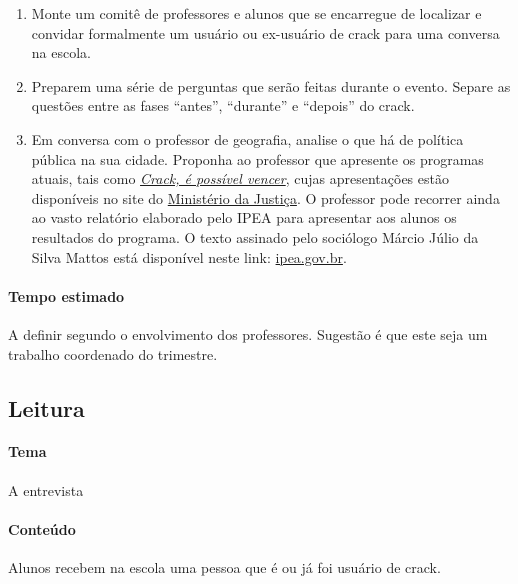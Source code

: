 \documentclass[12pt]{extarticle}
\begin{document}
\begin{enumerate}
	\item Monte um comitê de professores e alunos que se encarregue de 
	localizar e convidar formalmente um usuário ou ex-usuário de crack 
	para uma conversa na escola.

	\item Preparem uma série de perguntas que serão feitas durante 
	o evento. Separe as questões entre as fases ``antes'', ``durante'' 
	e ``depois'' do crack.

	\item Em conversa com o professor de geografia, analise o que há de 
	política pública na sua cidade. Proponha ao professor que apresente 
	os programas atuais, tais como \href{https://www.justica.gov.br/news/conheca-o-programa-crack-e-possivel-vencer}{\emph{Crack, é possível vencer}}, cujas
	apresentações estão disponíveis no site do \href{https://www.justica.gov.br/programas-e-planos/crack#:~:text=O%20Crack%2C%20%C3%A9%20poss%C3%ADvel%20vencer,%3A%20preven%C3%A7%C3%A3o%2C%20cuidado%20e%20autoridade}{Ministério da Justiça}.
	O professor pode recorrer ainda ao vasto relatório elaborado pelo IPEA para 
	apresentar aos alunos os resultados do programa. O texto assinado 
	pelo sociólogo Márcio Júlio da Silva Mattos está disponível 
	neste link: \href{https://www.ipea.gov.br/ppp/index.php/PPP/article/view/683}{ipea.gov.br}.
\end{enumerate}


\paragraph{Tempo estimado} A definir segundo o envolvimento dos professores. Sugestão é que 
	este seja um trabalho coordenado do trimestre. 

\subsection{Leitura}

\paragraph{Tema} A entrevista

\paragraph{Conteúdo} Alunos recebem na escola uma pessoa que é ou já foi usuário de crack.
\end{document}
